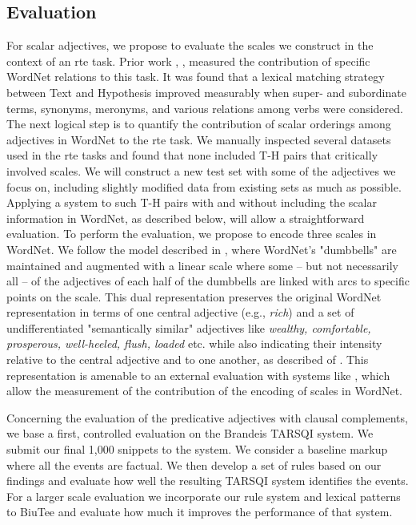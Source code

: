 \documentclass[10pt]{article}
\begin{document}
\subsection{Evaluation}

For scalar adjectives, we propose to evaluate the scales we construct in the context of an {\sc rte} task. Prior work \cite{clark2007role},
\cite{clark2008augmenting}, \cite{clark2008using} measured the contribution of specific WordNet relations 
to this task. It was found that a lexical matching strategy between Text and Hypothesis improved measurably when 
super- and subordinate terms, synonyms, meronyms, and various relations among verbs were considered. 
The next logical step is to quantify the contribution of scalar orderings among 
adjectives in WordNet to the {\sc rte} task.
We manually inspected several datasets used in the {\sc rte} tasks and found that none included T-H pairs that 
critically involved scales. We will construct a new test set with some of the adjectives we focus on, 
including slightly modified data from existing sets as much as possible. Applying a system to such T-H pairs 
with and without including the scalar information in WordNet, as described below, will allow a straightforward 
evaluation. 
To perform the evaluation, we propose to encode three scales in WordNet. We follow the model described in 
\cite{sheinmanetal2013}, where WordNet's "dumbbells" are maintained and augmented with a linear scale where 
some -- but not necessarily all -- of the adjectives of each half of the dumbbells are linked with arcs to specific 
points on the scale. This dual representation preserves the original WordNet representation in terms of one central 
adjective (e.g., \emph{rich}) and a set of undifferentiated "semantically similar" adjectives like \emph{wealthy, comfortable, prosperous, 
well-heeled, flush, loaded} etc. while  also indicating their intensity relative to the central adjective and to one another, as described  of \cite{sheinmanetal2013}. 
This representation is amenable to an external evaluation with systems like \cite{clark2007role}, which allow the measurement of the contribution 
of the encoding of  scales in WordNet.

Concerning the evaluation of the predicative adjectives with clausal complements,  we base a first, controlled evaluation on the Brandeis TARSQI system.  We submit our final 1,000 snippets to the system. We consider a baseline markup where all the events are factual. We then develop a set of rules based on our findings and evaluate how well the resulting TARSQI system identifies the events.  For a larger scale evaluation we incorporate our rule system and lexical patterns to BiuTee and evaluate how much it improves the performance of that system. 
\end{document}
